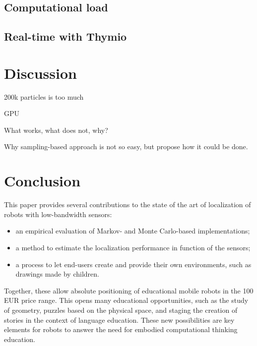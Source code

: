 \documentclass[letterpaper, 10pt, conference]{ieeeconf}
\begin{document}
\subsection{Computational load}

\subsection{Real-time with Thymio}

\section{Discussion}

200k particles is too much

GPU

What works, what does not, why?

Why sampling-based approach is not so easy, but propose how it could be done.

\section{Conclusion}

This paper provides several contributions to the state of the art of localization of robots with low-bandwidth sensors:
\begin{itemize}
\item an empirical evaluation of Markov- and Monte Carlo-based implementations;
\item a method to estimate the localization performance in function of the sensors;
\item a process to let end-users create and provide their own environments, such as drawings made by children.
\end{itemize}
Together, these allow absolute positioning of educational mobile robots in the 100 EUR price range.
This opens many educational opportunities, such as the study of geometry, puzzles based on the physical space, and staging the creation of stories in the context of language education.
These new possibilities are key elements for robots to answer the need for embodied computational thinking education.



\end{document}
